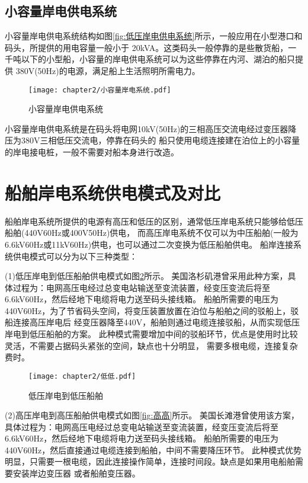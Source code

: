 \subsection{小容量岸电供电系统}

小容量岸电供电系统结构如图\ref{fig:低压岸电供电系统}所示，一般应用在小型港口和码头，所提供的用电容量一般小于
20kVA。这类码头一般停靠的是些散货船，一千吨以下的小型船，小容量的岸电供电系统可以为这些停靠在内河、湖泊的船只提供
380V(50Hz)的电源，满足船上生活照明所需电力。

\begin{figure}[!htp]
	\centering
	\texttt{[image: chapter2/小容量岸电系统.pdf]}
	\caption{小容量岸电供电系统}
	\label{fig:小容量岸电供电系统}
\end{figure}

小容量岸电供电系统是在码头将电网10kV(50Hz)的三相高压交流电经过变压器降压为380V三相低压交流电，停靠在码头的
船只使用电缆连接建在泊位上的小容量的岸电接电桩，一般不需要对船本身进行改造。

\section{船舶岸电系统供电模式及对比}

船舶岸电系统所提供的电源有高压和低压的区别，通常低压岸电系统只能够给低压船舶(440V60Hz或400V50Hz)供电，
而高压岸电系统不仅可以为中压船舶(一般为6.6kV60Hz或11kV60Hz)供电，也可以通过二次变换为低压船舶供电。
船岸连接系统供电模式可以分为以下三种类型：

(1)低压岸电到低压船舶供电模式如图\ref{fig:低低}所示。
美国洛杉矶港曾采用此种方案，具体过程为：电网高压电经过总变电站输送至变流装置，经变压变流后将至6.6kV60Hz，然后经地下电缆将电力送至码头接线箱。
船舶所需要的电压为440V60Hz，为了节省码头空间，将变压装置放置在泊位与船舶之间的驳船上，驳船连接高压岸电后
经变压器降至440V，船舶则通过电缆连接驳船，从而实现低压岸电到低压船舶的方案。
此种模式需要增加中间的驳船环节，优点是使用时比较灵活，不需要占据码头紧张的空间，缺点也十分明显，
需要多根电缆，连接复杂费时。

\begin{figure}[!htp]
	\centering
	\texttt{[image: chapter2/低低.pdf]}
	\caption{低压岸电到低压船舶}
	\label{fig:低低}
\end{figure}

(2)高压岸电到高压船舶供电模式如图\ref{fig:高高}所示。
美国长滩港曾使用该方案，具体过程为：电网高压电经过总变电站输送至变流装置，经变压变流后将至6.6kV60Hz，然后经地下电缆将电力送至码头接线箱。
船舶所需要的电压为440V60Hz，然后直接通过电缆连接到船舶，中间不需要降压环节。
此种模式优势明显，只需要一根电缆，因此连接操作简单，连接时间段。缺点是如果用电船舶需要安装岸边变压器
或者船舶变压器。

